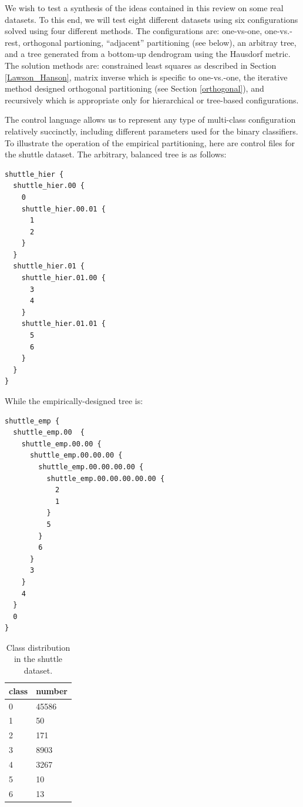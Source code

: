 \documentclass{article}
\begin{document}
We wish to test a synthesis of the ideas contained in this review on some real
datasets.
To this end, we will test eight different datasets using six configurations 
solved using four different methods.
The configurations are: one-vs-one, one-vs.-rest, orthogonal partioning,
``adjacent'' partitioning (see below), an arbitray tree, and a tree generated
from a bottom-up dendrogram using the Hausdorf metric.
The solution methods are: constrained least squares as described
in Section \ref{Lawson_Hanson}, matrix inverse which is specific to one-vs.-one,
the iterative method designed orthogonal partitioning 
(see Section \ref{orthogonal}), and recursively which is appropriate
only for hierarchical or tree-based configurations.

The control language allows us to represent any type of multi-class 
configuration relatively succinctly, including different parameters
used for the binary classifiers.
To illustrate the operation of the empirical partitioning, here are
control files for the shuttle dataset.
The arbitrary, balanced tree is as follows:
\begin{verbatim}
shuttle_hier {
  shuttle_hier.00 {
    0
    shuttle_hier.00.01 {
      1
      2
    }
  }
  shuttle_hier.01 {
    shuttle_hier.01.00 {
      3
      4
    }
    shuttle_hier.01.01 {
      5
      6
    }
  }
}

\end{verbatim}

While the empirically-designed tree is:
\begin{verbatim}
shuttle_emp {
  shuttle_emp.00  {
    shuttle_emp.00.00 {
      shuttle_emp.00.00.00 {
        shuttle_emp.00.00.00.00 {
          shuttle_emp.00.00.00.00.00 {
            2
            1
          }
          5
        }
        6
      }
      3
    }
    4
  }
  0
}
\end{verbatim}

\begin{table}
	\caption{Class distribution in the shuttle dataset.}
	\label{shuttle_dist}
	\begin{center}
	\begin{tabular}{|ll|}
		\hline
		class & number \\
		\hline
		0 & 45586 \\
		1 & 50 \\
		2 & 171 \\
		3 & 8903 \\
		4 & 3267 \\
		5 & 10 \\
		6 & 13 \\
		\hline
	\end{tabular}
	\end{center}
\end{table}
\end{document}
